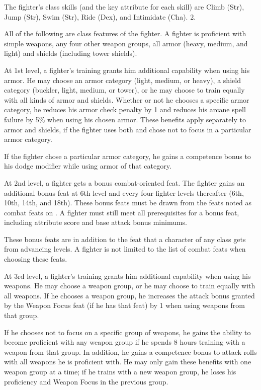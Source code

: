 The fighter's class skills (and the key attribute for each skill) are Climb (Str), Jump (Str), Swim (Str), Ride (Dex), and Intimidate (Cha).
 2.

All of the following are class features of the fighter.
   A fighter is proficient with simple weapons,  any four other weapon groups,  all armor (heavy, medium, and light) and shields (including tower shields).

 At 1st level, a fighter's training grants him additional capability when using his armor. He may choose an armor category (light, medium, or heavy), a shield category (buckler, light, medium, or tower), or he may choose to train equally with all kinds of armor and shields. Whether or not he chooses a specific armor category, he reduces his armor check penalty by 1 and reduces his arcane spell failure by 5\% when using his chosen armor. These benefits apply separately to armor and shields, if the fighter uses both and chose not to focus in a particular armor category.
\par If the fighter chose a particular armor category, he gains a  competence bonus to his dodge modifier while using armor of that category.

 At 2nd level, a fighter gets a bonus combat-oriented feat. The fighter gains an additional bonus feat at 6th level and every four fighter levels thereafter (6th, 10th, 14th, and 18th). These bonus feats must be drawn from the feats noted as combat feats on . A fighter must still meet all prerequisites for a bonus feat, including attribute score and base attack bonus minimums.

These bonus feats are in addition to the feat that a character of any class gets from advancing levels. A fighter is not limited to the list of combat feats when choosing these feats.

 At 3rd level, a fighter's training grants him additional capability when using his weapons. He may choose a weapon group, or he may choose to train equally with all weapons. If he chooses a weapon group, he increases the attack bonus granted by the Weapon Focus feat (if he has that feat) by 1 when using weapons from that group.
\par If he chooses not to focus on a specific group of weapons, he gains the ability to become proficient with any weapon group if he spends 8 hours training with a weapon from that group. In addition, he gains a  competence bonus to attack rolls with all weapons he is proficient with. He may only gain these benefits with one weapon group at a time; if he trains with a new weapon group, he loses his proficiency and Weapon Focus in the previous group.

